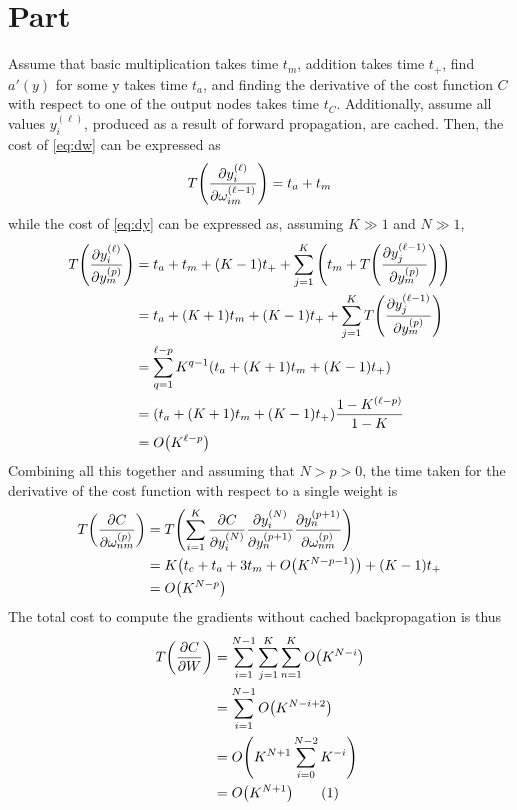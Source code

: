 \documentclass{article}
\newcommand{\enterproblemHeader}[1]{
}
\newcommand{\exitproblemHeader}[1]{
}
\newcounter{problem} %
\newcommand{\problemName}{}
\newenvironment{problem}[1][Part \theproblem]{ %
	\stepcounter{problem} %
	\renewcommand{\problemName}{#1} %
	\section{\problemName} %
	\enterproblemHeader{\problemName} %
}{
	\exitproblemHeader{\problemName} %
}
\newcommand{\numberthis}{\addtocounter{equation}{1}\tag{\theequation}}
\begin{document}
\begin{problem}
	Assume that basic multiplication takes time \(t_m\), addition takes time \(t_+\), find \(a'(y)\) for some y takes time \(t_a\), and finding the derivative of the cost function \(C\) with respect to one of the output nodes takes time \(t_C\). Additionally, assume all values \(y_i^{(\ell)}\), produced as a result of forward propagation, are cached. Then, the cost of \cref{eq:dw} can be expressed as
	\begin{equation*}
		T\qty(\pdv{y_i^{(\ell)}}{\omega_{im}^{(\ell - 1)}}) = t_a + t_m
	\end{equation*}
	while the cost of \cref{eq:dy} can be expressed as, assuming \(K \gg 1\) and \(N \gg 1\),
	\begin{align*}
		T\qty(\pdv{y_i^{(\ell)}}{y_m^{(p)}}) &= t_a + t_m + (K-1)t_+ + \sum_{j=1}^K \qty(t_m + T\qty(\pdv{y_j^{(\ell - 1)}}{y_m^{(p)}}))\\
		&= t_a + (K+1)t_m + (K-1)t_+ + \sum_{j=1}^K T\qty(\pdv{y_j^{(\ell - 1)}}{y_m^{(p)}}) \\
		&= \sum_{q = 1}^{\ell - p} K^{q - 1}\qty(t_a + (K+1)t_m + (K-1)t_+) \\
		&= \qty(t_a + (K+1)t_m + (K-1)t_+) \frac{1 - K^{(\ell - p)}}{1 - K} \\
		&= O\qty(K^{\ell - p})
	\end{align*}
	Combining all this together and assuming that \(N > p > 0\), the time taken for the derivative of the cost function with respect to a single weight is
	\begin{align*}
		T\qty(\pdv{C}{\omega_{nm}^{(p)}}) &= T\qty(\sum_{i=1}^{K}\pdv{C}{y_i^{(N)}}\pdv{y_i^{(N)}}{y_n^{(p+1)}}\pdv{y_n^{(p+1)}}{\omega_{nm}^{(p)}}) \\
		&= K\qty(t_c + t_a + 3 t_m + O\qty(K^{N - p - 1})) + (K - 1)t_+ \\
		&= O\qty(K^{N - p})
	\end{align*}
	The total cost to compute the gradients without cached backpropagation is thus
	\begin{align*}
		T\qty(\pdv{C}{W}) &= \sum_{i=1}^{N-1}\sum_{j=1}^K\sum_{n=1}^K O\qty(K^{N - i}) \\
		&= \sum_{i = 1}^{N-1}O\qty(K^{N - i + 2}) \\
		&= O\qty(K^{N+1}\sum_{i = 0}^{N-2}K^{-i}) \\
		&= O\qty(K^{N+1})\numberthis \label{eq:full cost}
	\end{align*}
	

\end{problem}
\end{document}
